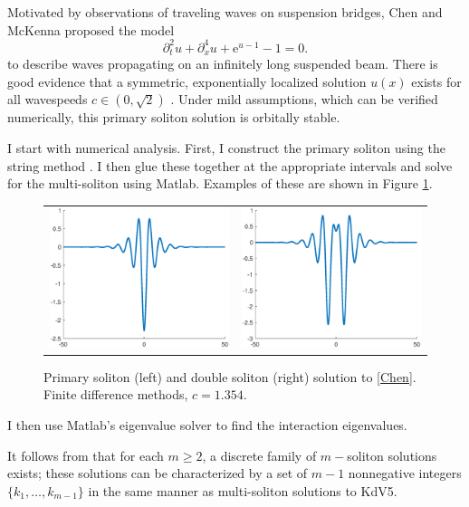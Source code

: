 \documentclass[12pt,reqno]{amsart}
\theoremstyle{definition}
\theoremstyle{remark}
\begin{document}
Motivated by observations of traveling waves on suspension bridges, Chen and McKenna \cite{Chen1997} proposed the model
\begin{equation}\label{Chen}
\partial_t^2 u + \partial_x^4 u + \mathrm{e}^{u-1} - 1 = 0.
\end{equation}
to describe waves propagating on an infinitely long suspended beam. There is good evidence that a symmetric, exponentially localized solution $u(x)$ exists for all wavespeeds $c \in (0, \sqrt{2})$ \cite{Smets2002,Berg2018}. Under mild assumptions, which can be verified numerically, this primary soliton solution is orbitally stable. 

I start with numerical analysis. First, I construct the primary soliton using the string method \cite{Chamard2011}. I then glue these together at the appropriate intervals and solve for the multi-soliton using Matlab. Examples of these are shown in Figure \ref{fig:chen1}.
\begin{figure}[ht]
\centering
\begin{tabular}{cc}
\includegraphics[width=6cm]{single1354}&
\includegraphics[width=6cm]{double1354}
\end{tabular}
\caption{Primary soliton (left) and double soliton (right) solution to \eqref{Chen}. Finite difference methods, $c = 1.354$.} 
\label{fig:chen1}
\end{figure}
I then use Matlab's eigenvalue solver to find the interaction eigenvalues.

It follows from \cite[Theorem~3.6]{SandstedeStrut} that for each $m \geq 2$, a discrete family of $m-$soliton solutions exists; these solutions can be characterized by a set of $m-1$ nonnegative integers $\{ k_1, \dots, k_{m-1} \}$ in the same manner as multi-soliton solutions to KdV5. 
\end{document}
